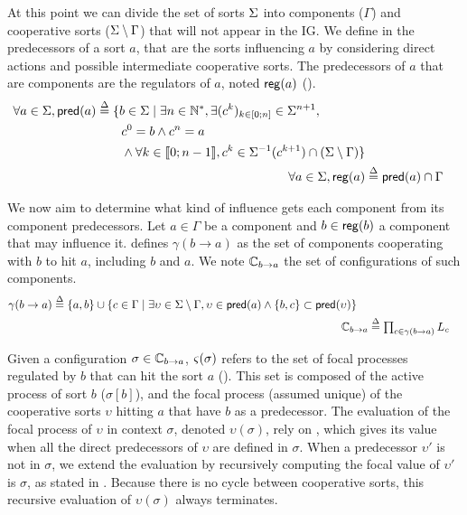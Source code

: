 At this point we can divide the set of sorts $\Sigma$ into components ($\Gamma$) and cooperative sorts
($\Sigma \setminus \Gamma$) that will not appear in the IG. 
We define in  the predecessors of a sort $a$, that are the sorts influencing $a$
by considering direct actions and possible intermediate cooperative sorts.
The predecessors of $a$ that are components are the regulators of $a$, noted $\mathsf{reg}({a})$
().
\begin{align}
\begin{split}
\forall a \in \Sigma, \mathsf{pred}(a) &\stackrel{\Delta}= \{b \in \Sigma \mid \exists n \in \mathbb{N}^*, \exists
(c^k)_{k \in [0;n]} \in \Sigma^{n+1}, \\
                                   & \quad \quad c^0 = b \wedge c^n = a \\
                                   & \quad \quad \wedge \forall k \in \llbracket 0 ; n-1 \rrbracket,
								   c^k \in \Sigma^{-1}(c^{k+1}) \cap (\Sigma\setminus\Gamma)\}
\end{split}
\label{eq:ph_predec}
\\
\forall a\in \Sigma, \mathsf{reg}({a}) & \stackrel{\Delta}= \mathsf{pred}(a) \cap \Gamma
\label{eq:regulators}
\end{align}

We now aim to determine what kind of influence gets each component from its component predecessors.
Let $a \in \Gamma$ be a component and $b \in \mathsf{reg}({b})$ a component that may influence it.
 defines 
$\gamma(b\rightarrow a)$ as the set of components cooperating with $b$ to hit $a$, including $b$ and
$a$.
We note $\mathbb C_{b\rightarrow a}$ the set of configurations of such components.
\begin{align}
\begin{split}
\gamma(b\rightarrow a)  &\stackrel{\Delta}= \{ a, b \} \cup \{ c \in \Gamma \mid 
			\exists \upsilon\in\Sigma\setminus\Gamma,
				\upsilon\in\mathsf{pred}(a) \wedge \{b,c\}\subset\mathsf{pred}(\upsilon) \}
\end{split}
\label{eq:cooperating-with-b}
\\
\mathbb C_{b\rightarrow a} & \stackrel{\Delta}= \textstyle\prod_{c\in\gamma(b\rightarrow a)} L_c
\label{eq:configurations}
\end{align}

Given a configuration $\sigma\in\mathbb C_{b\rightarrow a}$, $\varsigma(\sigma)$ refers to the set of focal processes
regulated by $b$ that can hit the sort $a$ ().
This set is composed of the active process of sort $b$ ($\sigma[b]$), and the focal process (assumed
unique) of the cooperative sorts $\upsilon$ hitting $a$ that have $b$ as a predecessor.
The evaluation of the focal process of $\upsilon$ in context $\sigma$, denoted $\upsilon(\sigma)$,
rely on , which gives its value when all the direct predecessors of
$\upsilon$ are defined in $\sigma$.
When a predecessor $\upsilon'$ is not in $\sigma$, we extend the evaluation by recursively computing
the focal value of $\upsilon'$ is $\sigma$, as stated in .
Because there is no cycle between cooperative sorts, this recursive evaluation of $\upsilon(\sigma)$
always terminates.

